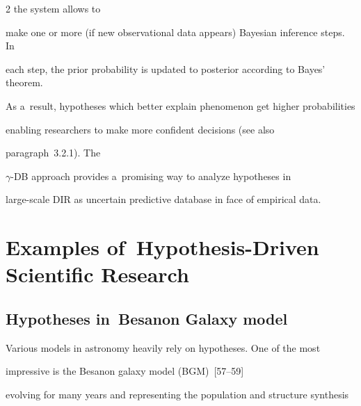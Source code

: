 \begin{multicols}{2}
  the system allows to


make one or more (if new observational data appears) Bayesian inference steps. In


each step, the prior probability is updated to posterior according to Bayes' theorem.


As a~result, hypotheses which better explain phenomenon get higher probabilities


enabling researchers to make more confident decisions (see also


paragraph~3.2.1). The


  $\gamma$-DB approach provides a~promising way to analyze hypotheses in


  large-scale DIR as uncertain predictive database in face of empirical data.





  \vspace*{-6pt}





\section{Examples of~Hypothesis-Driven Scientific Research}





\vspace*{-3pt}





\subsection{Hypotheses in~Besan{\!\!\fontsize{14pt}{10pt}\selectfont{}}on Galaxy model}





\vspace*{-1pt}





  \noindent


  Various models in astronomy heavily rely on hypotheses. One of the most


impressive is the Besan{\!\fontsize{12pt}{10pt}\selectfont{}}on galaxy model (BGM)~[57--59]


evolving for many years and representing the population and structure synthesis



\end{multicols}

